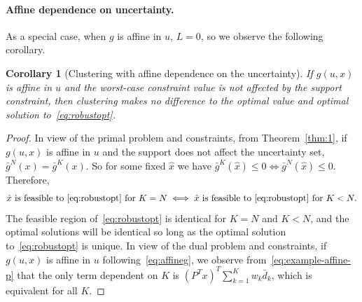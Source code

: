 \documentclass[12pt]{article}
\theoremstyle{thmstyleone}%
\newtheorem{corollary}[theorem]{Corollary}%
\theoremstyle{thmstyletwo}%
\theoremstyle{thmstylethree}%
\newcommand{\reviewChanges}{}
\begin{document}
\paragraph{Affine dependence on uncertainty.}%
As a special case, when $g$ is affine in $u$, $L = 0$, so we observe the following corollary.
\begin{corollary}[Clustering with affine dependence on the uncertainty]
	\label{cor:affine}
	\reviewChanges{
If $g(u,x)$ is affine in $u$ and the worst-case constraint value is not affected by the support constraint, then clustering makes no difference to the optimal value and optimal solution to~\eqref{eq:robustopt}.}
\end{corollary}
\begin{proof}
In view of the primal problem and constraints, from Theorem~\ref{thm:1}, if $g(u,x)$ is affine in $u$ and the support does not affect the uncertainty set, $\bar{g}^N(x) = \bar{g}^K(x)$.
So for some fixed $\hat{x}$ we have ${\bar{g}^K(\hat{x}) \leq 0 \iff \bar{g}^N(\hat{x}) \leq 0}$. Therefore,
\[
    \hat{x} \text{ is feasible to~\eqref{eq:robustopt} for $K = N$} \iff \hat{x} \text{ is feasible to~\eqref{eq:robustopt} for $K < N.$}
\]
The feasible region of~\eqref{eq:robustopt} is identical for $K=N$ and $K < N$, and the optimal solutions will be identical so long as the optimal solution to~\eqref{eq:robustopt} is unique.
In view of the dual problem and constraints, if $g(u,x)$ is affine in $u$ following~\eqref{eq:affineg}, we observe from~\eqref{eq:example-affine-p} that the only term dependent on $K$ is  $(P^Tx)^T\sum_{k=1}^{K} w_k \bar{d}_k$, which is equivalent for all $K$.
\end{proof}
\end{document}
